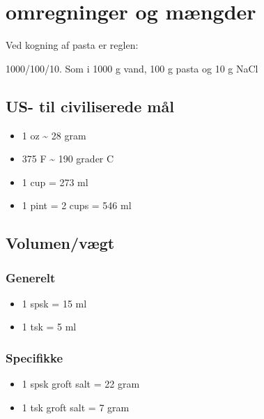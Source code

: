 \documentclass[
]{book}
\providecommand{\tightlist}{%
  \setlength{\itemsep}{0pt}\setlength{\parskip}{0pt}}
\begin{document}
\hypertarget{omregninger-og-muxe6ngder}{%
\chapter{omregninger og mængder}\label{omregninger-og-muxe6ngder}}

Ved kogning af pasta er reglen:

1000/100/10. Som i 1000 g vand, 100 g pasta og 10 g NaCl

\hypertarget{us--til-civiliserede-muxe5l}{%
\section{US- til civiliserede mål}\label{us--til-civiliserede-muxe5l}}

\begin{itemize}
\tightlist
\item
  1 oz \textasciitilde{} 28 gram
\item
  375 F \textasciitilde{} 190 grader C
\item
  1 cup = 273 ml
\item
  1 pint = 2 cups = 546 ml
\end{itemize}

\hypertarget{volumenvuxe6gt}{%
\section{Volumen/vægt}\label{volumenvuxe6gt}}

\hypertarget{generelt}{%
\subsection{Generelt}\label{generelt}}

\begin{itemize}
\tightlist
\item
  1 spsk = 15 ml
\item
  1 tsk = 5 ml
\end{itemize}

\hypertarget{specifikke}{%
\subsection{Specifikke}\label{specifikke}}

\begin{itemize}
\tightlist
\item
  1 spsk groft salt = 22 gram
\item
  1 tsk groft salt = 7 gram
\end{itemize}
\end{document}

